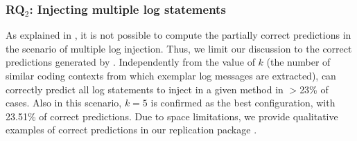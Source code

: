 %


\subsubsection{RQ$_{2}$: Injecting multiple log statements}
\label{sec:rq2}
As explained in , it is not possible to compute the partially correct predictions in the scenario of multiple log injection. Thus, we limit our discussion to the correct predictions generated by \approach. Independently from the value of $k$ (\ie the number of similar coding contexts from which exemplar log messages are extracted), \approach can correctly predict all log statements to inject in a given method in $>$23\% of cases. Also in this scenario, $k=5$ is confirmed as the best configuration, with 23.51\% of correct predictions. Due to space limitations, we provide qualitative examples of correct predictions in our replication package \cite{replication}. 

